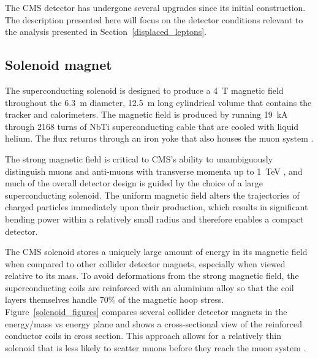 The CMS detector has undergone several upgrades since its initial construction. The description presented here will focus on the detector conditions relevant to the analysis presented in Section~\ref{displaced_leptons}.

\subsection{Solenoid magnet}
The superconducting solenoid is designed to produce a \SI{4}{\tesla} magnetic field throughout the \SI{6.3}{\metre} diameter, \SI{12.5}{\metre} long cylindrical volume that contains the tracker and calorimeters. The magnetic field is produced by running \SI{19}{\kA} through 2168 turns of NbTi superconducting cable that are cooled with liquid helium. The flux returns through an iron yoke that also houses the muon system \cite{cms_experiment}.

The strong magnetic field is critical to CMS's ability to unambiguously distinguish muons and anti-muons with transverse momenta up to \SI{1}{\TeV} \cite{cms_tdr_v1}, and much of the overall detector design is guided by the choice of a large superconducting solenoid. The uniform magnetic field alters the trajectories of charged particles immediately upon their production, which results in significant bending power within a relatively small radius and therefore enables a compact detector.

The CMS solenoid stores a uniquely large amount of energy in its magnetic field when compared to other collider detector magnets, especially when viewed relative to its mass. To avoid deformations from the strong magnetic field, the superconducting coils are reinforced with an aluminium alloy so that the coil layers themselves handle 70\% of the magnetic hoop stress. Figure~\ref{solenoid_figures} compares several collider detector magnets in the energy/mass vs energy plane and shows a cross-sectional view of the reinforced conductor coils in cross section. This approach allows for a relatively thin solenoid that is less likely to scatter muons before they reach the muon system \cite{cms_experiment}. 



